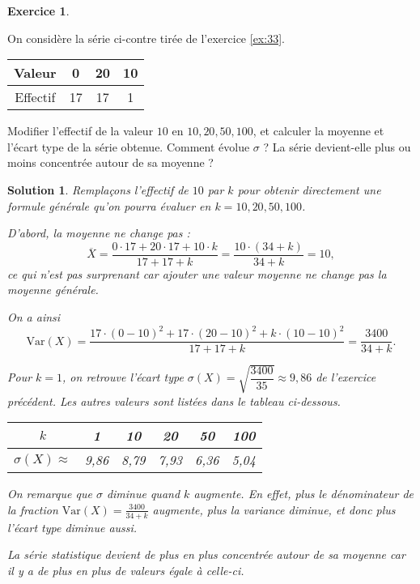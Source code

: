 \documentclass[a4paper, 14pt]{extarticle}
\theoremstyle{plain}
\newtheorem*{sol}{Solution}
\theoremstyle{definition}
\newtheorem{ex}{Exercice}
\newcommand{\Var}[1]{\text{Var}(#1)}
\newcommand{\exe}[2]{
		\begin{ex} #1  \end{ex}
		\begin{sol} #2 \end{sol}
	}
\newcommand{\exe}[2]{
		\begin{ex} #1  \end{ex}
	}
\begin{document}
\exe{
	\begin{multicols}{2}
	On considère la série ci-contre tirée de l'exercice \ref{ex:33}.
	
		\begin{center}
		\begin{tabular}{|c|c|c|c|}\hline
		Valeur   & 0 & 20 & 10 \\ \hline
		Effectif & 17 & 17 & 1 \\ \hline
		\end{tabular}
		\end{center}
	\end{multicols}
		
	Modifier l'effectif de la valeur $10$ en $10, 20, 50, 100$, et calculer la moyenne et l'écart type de la série obtenue.
	Comment évolue $\sigma$ ? La série devient-elle plus ou moins concentrée autour de sa moyenne ?
}{
	Remplaçons l'effectif de $10$ par $k$ pour obtenir directement une formule générale qu'on pourra évaluer en $k=10, 20, 50, 100$.

	D'abord, la moyenne ne change pas :
		\[ \overline{X} = \dfrac{0\cdot17 + 20\cdot17 + 10\cdot k}{17+17+k} = \dfrac{10\cdot(34 + k)}{34+k} = 10, \]
	ce qui n'est pas surprenant car ajouter une valeur moyenne ne change pas la moyenne générale.

	On a ainsi 
		\[ \Var{X} = \dfrac{17\cdot(0-10)^2+17\cdot(20-10)^2 + k\cdot(10-10)^2}{17+17+k} = \dfrac{3400}{34+k}. \]
		
	Pour $k=1$, on retrouve l'écart type $\sigma(X) = \sqrt{\dfrac{3400}{35}} \approx 9,86$ de l'exercice précédent.
	Les autres valeurs sont listées dans le tableau ci-dessous.
	
	\begin{center}
	\begin{tabular}{|c|c|c|c|c|c|}\hline
		$k$ & 1 & 10 & 20 & 50 & 100 \\ \hline
		$\sigma(X) \approx$ & 9,86 & 8,79 & 7,93 & 6,36 & 5,04 \\ \hline
	\end{tabular}
	\end{center}
	
	On remarque que $\sigma$ diminue quand $k$ augmente.
	En effet, plus le dénominateur de la fraction $\Var{X} = \frac{3400}{34+k}$ augmente, plus la variance diminue, et donc plus l'écart type diminue aussi.
	
	La série statistique devient de plus en plus concentrée autour de sa moyenne car il y a de plus en plus de valeurs égale à celle-ci.
}
\end{document}
